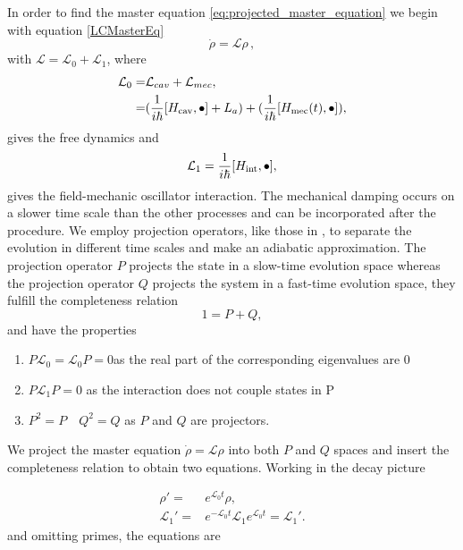 \documentclass[reprint, amsmath,amssymb, aps,pra]{revtex4-1}
\begin{document}
In order to find the master equation
\eqref{eq:projected_master_equation} we begin with equation \eqref{LCMasterEq}
\begin{equation}
\dot{\rho}=\mathcal{L}\rho\, ,
\end{equation}
with $\mathcal{L}=\mathcal{L}_0+\mathcal{L}_1$,
where
\begin{align}
\mathcal{L}_0=& \mathcal{L}_{cav} + \mathcal{L}_{mec},\\
 =&(\frac{1}{i\hbar}[H_{\rm cav},\bullet]+L_a) +(\frac{1}{i\hbar}[H_{\rm mec}(t),\bullet]), \nonumber
\end{align}
gives the free dynamics 
and
\begin{equation}
\mathcal{L}_1 = \frac{1}{i\hbar}[H_{\rm int},\bullet],
\end{equation}
gives the field-mechanic oscillator interaction. The mechanical damping occurs on a slower time scale than the other processes and can be incorporated after the procedure. We employ projection
operators, like those in \cite{CarmichaelQO}, to separate the
evolution in different time scales and make an adiabatic
approximation. The projection operator $P$ projects the state in a
slow-time evolution space whereas the projection operator $Q$ projects
the system in a fast-time evolution space, they fulfill the completeness
relation
\begin{equation}
1 = P + Q,
\end{equation}
and have the properties
\begin{enumerate}

\item $ P\mathcal{L}_{0} = \mathcal{L}_{0}P = 0 $\qquad as the real part of the
  corresponding eigenvalues are 0 

\item $P\mathcal{L}_{1}P=0$ \qquad as the interaction does not couple states in P

\item $P^2 = P \quad Q^2 = Q$ \qquad as $P$ and $Q$ are projectors.
\end{enumerate} We project
the master equation $\dot{\rho}=\mathcal{L}\rho$ into both $P$ and $Q$
spaces and insert the completeness relation to obtain two equations.
Working in the decay picture

\begin{align*}
 \rho' =& e^{\mathcal{L}_0t}\rho,\\
 \mathcal{L}_1' =& e^{-\mathcal{L}_0t}\mathcal{L}_1e^{\mathcal{L}_0t} = \mathcal{L}_1'.
\end{align*} and omitting primes, the equations are
\end{document}
